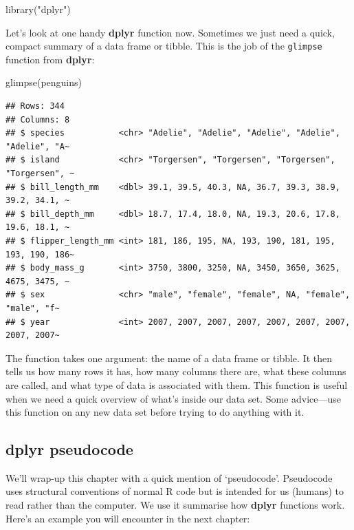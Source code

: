 \documentclass[
]{book}
\newenvironment{Shaded}{\begin{snugshade}}{\end{snugshade}}
\newcommand{\FunctionTok}[1]{\textcolor[rgb]{0.00,0.00,0.00}{#1}}
\newcommand{\NormalTok}[1]{#1}
\newcommand{\StringTok}[1]{\textcolor[rgb]{0.31,0.60,0.02}{#1}}
\begin{document}
\begin{Shaded}
\begin{Highlighting}[]
\FunctionTok{library}\NormalTok{(}\StringTok{"dplyr"}\NormalTok{)}
\end{Highlighting}
\end{Shaded}

Let's look at one handy \textbf{dplyr} function now. Sometimes we just need a quick, compact summary of a data frame or tibble. This is the job of the \texttt{glimpse} function from \textbf{dplyr}:

\begin{Shaded}
\begin{Highlighting}[]
\FunctionTok{glimpse}\NormalTok{(penguins)}
\end{Highlighting}
\end{Shaded}

\begin{verbatim}
## Rows: 344
## Columns: 8
## $ species           <chr> "Adelie", "Adelie", "Adelie", "Adelie", "Adelie", "A~
## $ island            <chr> "Torgersen", "Torgersen", "Torgersen", "Torgersen", ~
## $ bill_length_mm    <dbl> 39.1, 39.5, 40.3, NA, 36.7, 39.3, 38.9, 39.2, 34.1, ~
## $ bill_depth_mm     <dbl> 18.7, 17.4, 18.0, NA, 19.3, 20.6, 17.8, 19.6, 18.1, ~
## $ flipper_length_mm <int> 181, 186, 195, NA, 193, 190, 181, 195, 193, 190, 186~
## $ body_mass_g       <int> 3750, 3800, 3250, NA, 3450, 3650, 3625, 4675, 3475, ~
## $ sex               <chr> "male", "female", "female", NA, "female", "male", "f~
## $ year              <int> 2007, 2007, 2007, 2007, 2007, 2007, 2007, 2007, 2007~
\end{verbatim}

The function takes one argument: the name of a data frame or tibble. It then tells us how many rows it has, how many columns there are, what these columns are called, and what type of data is associated with them. This function is useful when we need a quick overview of what's inside our data set. Some advice---use this function on any new data set before trying to do anything with it.

\hypertarget{dplyr-pseudocode}{%
\subsection{\texorpdfstring{\textbf{dplyr} pseudocode}{dplyr pseudocode}}\label{dplyr-pseudocode}}

We'll wrap-up this chapter with a quick mention of `pseudocode'. Pseudocode uses structural conventions of normal R code but is intended for us (humans) to read rather than the computer. We use it summarise how \textbf{dplyr} functions work. Here's an example you will encounter in the next chapter:
\end{document}

